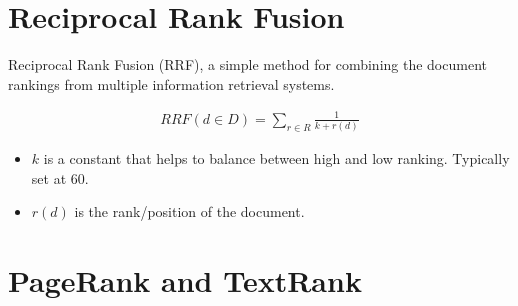 \section{Reciprocal Rank Fusion }
\label{sec:nlp_rrf}
Reciprocal Rank Fusion (RRF), a simple method for combining the document rankings from multiple information retrieval systems.

\begin{align*}
	RRF(d\in D) = \sum_{r\in R}\frac{1}{k+r(d)}
\end{align*}
\begin{itemize}
	\item $k$ is a constant that helps to balance between high and low ranking. Typically set at 60.
	\item $r(d)$ is the rank/position of the document.
\end{itemize}


\section{PageRank and TextRank}







